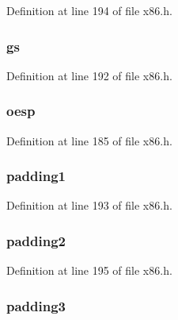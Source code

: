 Definition at line 194 of file x86.\-h.

\hypertarget{structtrapframe_aaeba1ea8da31d7740b55bc9d8efcacc5}{
\subsubsection[{gs}]{ gs}}\label{structtrapframe_aaeba1ea8da31d7740b55bc9d8efcacc5}


Definition at line 192 of file x86.\-h.

\hypertarget{structtrapframe_a2fe573b67842f4aaa53302d128ac3ef3}{
\subsubsection[{oesp}]{ oesp}}\label{structtrapframe_a2fe573b67842f4aaa53302d128ac3ef3}


Definition at line 185 of file x86.\-h.

\hypertarget{structtrapframe_af1bf63d9df475699143c50918af7c3b9}{
\subsubsection[{padding1}]{ padding1}}\label{structtrapframe_af1bf63d9df475699143c50918af7c3b9}


Definition at line 193 of file x86.\-h.

\hypertarget{structtrapframe_a352099edda0c7698cf5f352878346448}{
\subsubsection[{padding2}]{ padding2}}\label{structtrapframe_a352099edda0c7698cf5f352878346448}


Definition at line 195 of file x86.\-h.

\hypertarget{structtrapframe_a1d1a645b86f97ca1844887d6178675aa}{
\subsubsection[{padding3}]{ padding3}}\label{structtrapframe_a1d1a645b86f97ca1844887d6178675aa}


